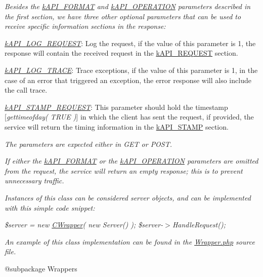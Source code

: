 {\itshape Besides the \hyperlink{}{k\-A\-P\-I\-\_\-\-F\-O\-R\-M\-A\-T} and \hyperlink{}{k\-A\-P\-I\-\_\-\-O\-P\-E\-R\-A\-T\-I\-O\-N} parameters described in the first section, we have three other optional parameters that can be used to receive specific information sections in the response\-:}

{\itshape 
\begin{DoxyItemize}
\item {\itshape \hyperlink{}{k\-A\-P\-I\-\_\-\-L\-O\-G\-\_\-\-R\-E\-Q\-U\-E\-S\-T}}\-: Log the request, if the value of this parameter is 1, the response will contain the received request in the \hyperlink{}{k\-A\-P\-I\-\_\-\-R\-E\-Q\-U\-E\-S\-T} section. 
\item {\itshape \hyperlink{}{k\-A\-P\-I\-\_\-\-L\-O\-G\-\_\-\-T\-R\-A\-C\-E}}\-: Trace exceptions, if the value of this parameter is 1, in the case of an error that triggered an exception, the error response will also include the call trace. 
\item {\itshape \hyperlink{}{k\-A\-P\-I\-\_\-\-S\-T\-A\-M\-P\-\_\-\-R\-E\-Q\-U\-E\-S\-T}}\-: This parameter should hold the timestamp \mbox{[}{\itshape gettimeofday( T\-R\-U\-E )}\mbox{]} in which the client has sent the request, if provided, the service will return the timing information in the \hyperlink{}{k\-A\-P\-I\-\_\-\-S\-T\-A\-M\-P} section. 
\end{DoxyItemize}}

{\itshape The parameters are expected either in {\itshape G\-E\-T} or {\itshape P\-O\-S\-T}.}

{\itshape If either the \hyperlink{}{k\-A\-P\-I\-\_\-\-F\-O\-R\-M\-A\-T} or the \hyperlink{}{k\-A\-P\-I\-\_\-\-O\-P\-E\-R\-A\-T\-I\-O\-N} parameters are omitted from the request, the service will return an empty response; this is to prevent unnecessary traffic.}

{\itshape Instances of this class can be considered server objects, and can be implemented with this simple code snippet\-:}

{\itshape {\ttfamily  \$server = new \hyperlink{class_c_wrapper}{C\-Wrapper}( new Server() ); \$server-\/$>$Handle\-Request(); }}

{\itshape An example of this class implementation can be found in the \hyperlink{}{Wrapper.\-php} source file.}

{\itshape \begin{DoxyVerb} @subpackage        Wrappers\end{DoxyVerb}
}


